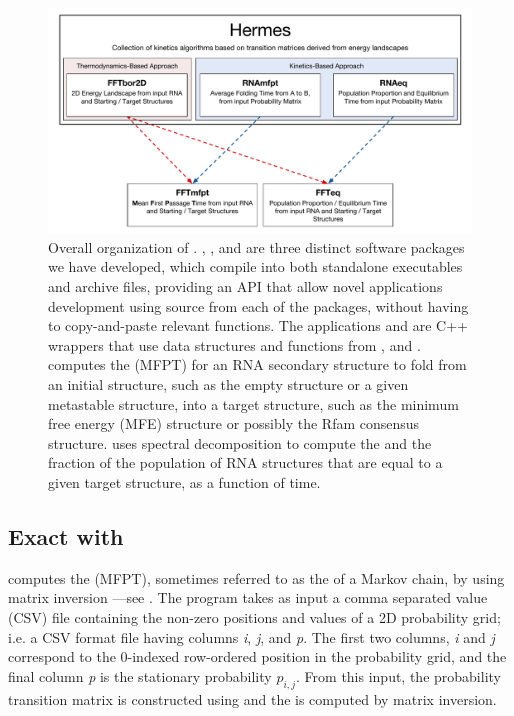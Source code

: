 \begin{figure}[!ht]
\centering
\includegraphics[width=.9\textwidth]{Figures/Hermes/softwareOrg.pdf}
\caption{Overall organization of
\hermes. \ffttwo, \rnamfpt, and \rnaeq are three distinct software
packages we have developed, which compile into both standalone
executables and archive files, providing an API that allow novel
applications development using source from each of the packages,
without having to copy-and-paste relevant functions. The applications
\fftmfpt and \ffteq are C++ wrappers that use data structures and functions from
\ffttwo, \rnamfpt and \rnaeq. \fftmfpt computes the
\mfpt (MFPT) for an RNA secondary structure to fold from an
initial structure, such as the empty structure or a given metastable
structure, into a target structure, such as the minimum free energy
(MFE) structure or possibly the Rfam \citep{Gardner.nar11} consensus
structure. \ffteq uses spectral decomposition to compute the \eqt and the
fraction of the population of RNA structures that are
equal to a given target structure, as a function of time.
}
\label{fig:hermes:organizationHermes}
\end{figure}

\subsection{Exact \mfpt with \rnamfpt}
\label{subsec:hermes:rnamfpt}

\rnamfpt computes the \mfpt (MFPT), sometimes
referred to as the \hit of a Markov chain, by using
matrix inversion \citep{meyermfpt}---see
. The program takes as input a
comma separated value (CSV) file containing the non-zero positions and
values of a 2D probability grid; i.e. a CSV format file having columns {\em i},
{\em j}, and {\em p}. The first two columns, {\em i} and {\em j}
correspond to the 0-indexed row-ordered position in the probability grid, and
the final column {\em p} is the stationary probability $p_{i,j}$.
From this input, the probability transition matrix is constructed using
 and the
\mfpt is computed by matrix inversion.

